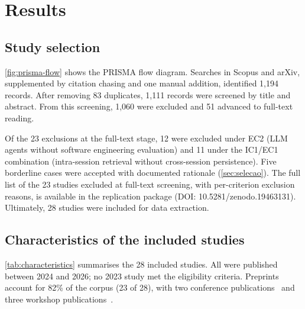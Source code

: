 \section{Results}
\label{sec:results}

\subsection{Study selection}
\label{sec:study-selection}

\autoref{fig:prisma-flow} shows the PRISMA flow diagram.
Searches in Scopus and arXiv, supplemented by citation chasing and one
manual addition, identified 1,194 records.
After removing 83 duplicates, 1,111 records were screened by title and
abstract.
From this screening, 1,060 were excluded and 51 advanced to full-text
reading.

Of the 23 exclusions at the full-text stage, 12 were excluded under EC2
(LLM agents without software engineering evaluation) and 11 under the
IC1/EC1 combination (intra-session retrieval without cross-session
persistence).
Five borderline cases were accepted with documented rationale
(\autoref{sec:selecao}).
The full list of the 23 studies excluded at full-text screening, with
per-criterion exclusion reasons, is available in the replication package
(DOI: 10.5281/zenodo.19463131).
Ultimately, 28 studies were included for data extraction.



\FloatBarrier
\subsection{Characteristics of the included studies}
\label{sec:characteristics}

\autoref{tab:characteristics} summarises the 28 included studies.
All were published between 2024 and 2026; no 2023 study met the
eligibility criteria.
Preprints account for 82\% of the corpus (23 of 28), with two
conference
publications~\citep{wang2026improving,zhang2025darwingodel} and three
workshop
publications~\citep{deshpande2025memtrack,shen2025talm,lindenbauer2025ctimrover}.

